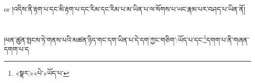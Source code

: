 er{ }།འདིས་ནི་རྟག་པ་དང་མི་རྟག་པ་དང་རིམ་དང་རིམ་པ་མ་ཡིན་པ་ལ་སོགས་པ་ཡང་རྣམ་པར་བཤད་པ་ཡིན་ནོ།\chapter{ }།ཕན་ཚུན་སྤངས་ཏེ་གནས་པའི་མཚན་ཉིད་གང་དག་ཡིན་པ་དེ་དག་ཀྱང་གཅིག་:ཡོད་པ་དང་\footnote{«སྣར་»«པེ་»ཡོད་པ་}དགག་པ་ནི་གཞན་དགག་པ་ད